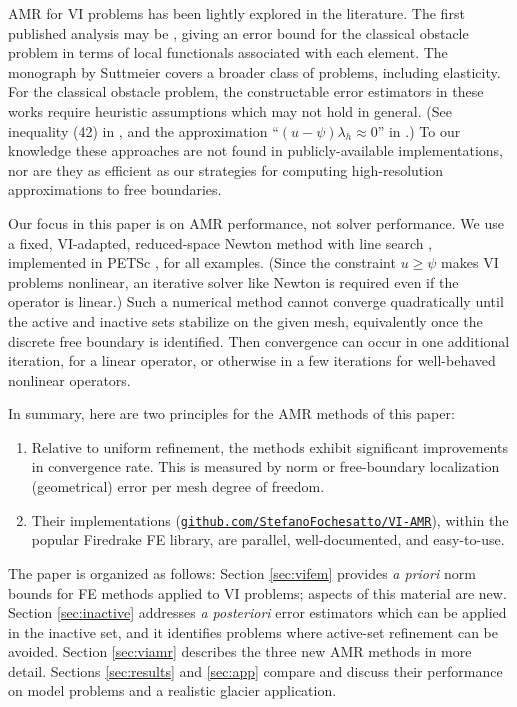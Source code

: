 \documentclass[]{interact}
\theoremstyle{plain}%
\theoremstyle{definition}
\theoremstyle{remark}
\begin{document}
AMR for VI problems has been lightly explored in the literature.  The first published analysis may be \cite{AinsworthOdenLee1993}, giving an error bound for the classical obstacle problem in terms of local functionals associated with each element.  The monograph by Suttmeier \cite{Suttmeier2008} covers a broader class of problems, including elasticity.  For the classical obstacle problem, the constructable error estimators in these works require heuristic assumptions which may not hold in general.  (See inequality (42) in \cite{AinsworthOdenLee1993}, and the approximation ``$(u-\psi)\lambda_h\approx 0$'' in \cite{Suttmeier2008}.)  To our knowledge these approaches are not found in publicly-available implementations, nor are they as efficient as our strategies for computing high-resolution approximations to free boundaries.

Our focus in this paper is on AMR performance, not solver performance.  We use a fixed, VI-adapted, reduced-space Newton method with line search \cite{BensonMunson2006}, implemented in PETSc \cite{petsc-user-ref}, for all examples.  (Since the constraint $u \geq \psi$ makes VI problems nonlinear, an iterative solver like Newton is required even if the operator is linear.)  Such a numerical method cannot converge quadratically until the active and inactive sets stabilize on the given mesh, equivalently once the discrete free boundary is identified.  Then convergence can occur in one additional iteration, for a linear operator, or otherwise in a few iterations for well-behaved nonlinear operators.

In summary, here are two principles for the AMR methods of this paper:
\renewcommand{\labelenumi}{\arabic{enumi}.}
\begin{enumerate}
\item Relative to uniform refinement, the methods exhibit significant improvements in convergence rate.  This is measured by norm or free-boundary localization (geometrical) error per mesh degree of freedom.
\item Their implementations (\href{https://github.com/StefanoFochesatto/VI-AMR}{{\small \texttt{github.com/StefanoFochesatto/VI-AMR}}}), within the popular Firedrake \cite{Langeetal2016} FE library, are parallel, well-documented, and easy-to-use.
\end{enumerate}

The paper is organized as follows:  Section \ref{sec:vifem} provides \emph{a priori} norm bounds for FE methods applied to VI problems; aspects of this material are new.  Section \ref{sec:inactive} addresses \emph{a posteriori} error estimators which can be applied in the inactive set, and it identifies problems where active-set refinement can be avoided.  Section \ref{sec:viamr} describes the three new AMR methods in more detail.  Sections \ref{sec:results} and \ref{sec:app} compare and discuss their performance on model problems and a realistic glacier application.
\end{document}
